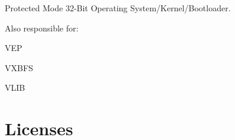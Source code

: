 \href{https://app.fossa.com/projects/git%2Bgithub.com%2Fryelow90210%2FVitalityX?ref=badge_shield}{\tt }

Protected Mode 32-\/\+Bit Operating System/\+Kernel/\+Bootloader.

Also responsible for\+:
\begin{DoxyEnumerate}
\item V\+EP
\item V\+X\+B\+FS
\item V\+L\+IB
\end{DoxyEnumerate}\hypertarget{a00338_autotoc_md15}{}\section{Licenses}\label{a00338_autotoc_md15}
\href{https://app.fossa.com/projects/git%2Bgithub.com%2Fryelow90210%2FVitalityX?ref=badge_large}{\tt }

